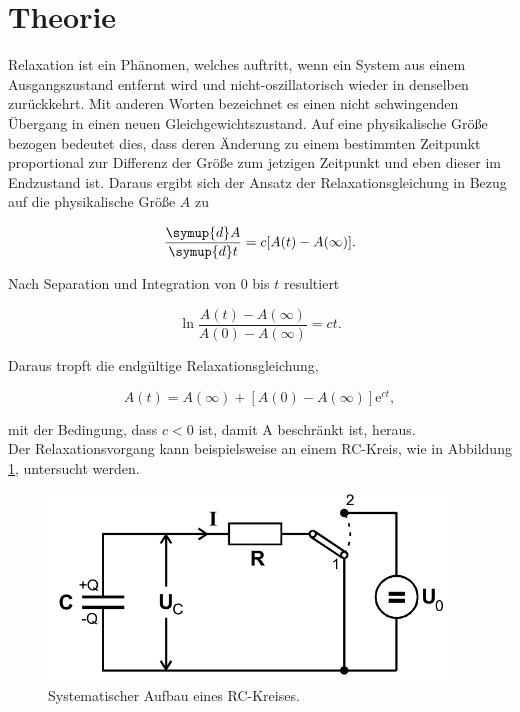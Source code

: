 \section{Theorie}
\label{sec:Theorie}
Relaxation ist ein Phänomen, welches auftritt, wenn ein System aus einem Ausgangszustand entfernt wird und nicht-oszillatorisch wieder in denselben zurückkehrt.
Mit anderen Worten bezeichnet es einen nicht schwingenden Übergang in einen neuen Gleichgewichtszustand.
Auf eine physikalische Größe bezogen bedeutet dies, dass deren Änderung zu einem bestimmten Zeitpunkt proportional zur Differenz der Größe zum jetzigen Zeitpunkt und eben dieser im Endzustand ist.
Daraus ergibt sich der Ansatz der Relaxationsgleichung in Bezug auf die physikalische Größe $A$ zu

\begin{equation}
 \frac{\symup{d} A}{\symup{d} t} = c [A(t) - A(\infty)].
\end{equation}

Nach Separation und Integration von $0$ bis $t$ resultiert

\begin{equation}
 \ln\frac{A(t)-A(\infty)}{A(0)-A(\infty)} = ct.
\end{equation}

Daraus tropft die endgültige Relaxationsgleichung,

\begin{equation}
  A(t) = A(\infty) + [A(0) - A(\infty)] \mathrm{e}^{ct}, \label{eqn:gl}
\end{equation}

mit der Bedingung, dass $c<0$ ist, damit A beschränkt ist, heraus.\\
Der Relaxationsvorgang kann beispielsweise an einem RC-Kreis, wie in Abbildung \ref{fig:1}, untersucht werden.

\begin{figure}[H]
  \centering
  \includegraphics[height=5cm]{kreis.png}
  \caption{Systematischer Aufbau eines RC-Kreises. \cite{sample}}
  \label{fig:1}
\end{figure}

